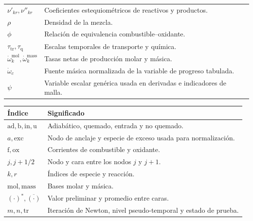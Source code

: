 \documentclass[12pt,a4paper,twoside,openany]{book}
\begin{document}
\begin{longtable}{@{}p{}p{}@{}}
\(\nu'_{kr},\nu''_{kr}\) & Coeficientes estequiométricos de reactivos y productos. \\
\(\rho\) & Densidad de la mezcla. \\
\(\phi\) & Relación de equivalencia combustible--oxidante. \\
\(\tau_{\mathrm{tr}},\tau_{\mathrm q}\) & Escalas temporales de transporte y química. \\
\(\dot\omega_k^{\mathrm{mol}},\dot\omega_k^{\mathrm{mass}}\) & Tasas netas de producción molar y másica. \\
\(\dot\omega_c\) & Fuente másica normalizada de la variable de progreso tabulada. \\
\(\psi\) & Variable escalar genérica usada en derivadas e indicadores de malla. \\
\bottomrule
\end{longtable}

\begin{longtable}{@{}p{}p{}@{}}
\toprule
\textbf{Índice} & \textbf{Significado} \\
\midrule
\endhead
\(\mathrm{ad},\mathrm b,\mathrm{in},\mathrm u\) & Adiabático, quemado, entrada y no quemado. \\
\(a,\mathrm{exc}\) & Nodo de anclaje y especie de exceso usada para normalización. \\
\(\mathrm f,\mathrm{ox}\) & Corrientes de combustible y oxidante. \\
\(j,j\!+\!1/2\) & Nodo y cara entre los nodos \(j\) y \(j+1\). \\
\(k,r\) & Índices de especie y reacción. \\
\(\mathrm{mol},\mathrm{mass}\) & Bases molar y másica. \\
\((\cdot)^*,\overline{(\cdot)}\) & Valor preliminar y promedio entre caras. \\
\(m,n,\mathrm{tr}\) & Iteración de Newton, nivel pseudo-temporal y estado de prueba. \\
\bottomrule
\end{longtable}
\end{document}
